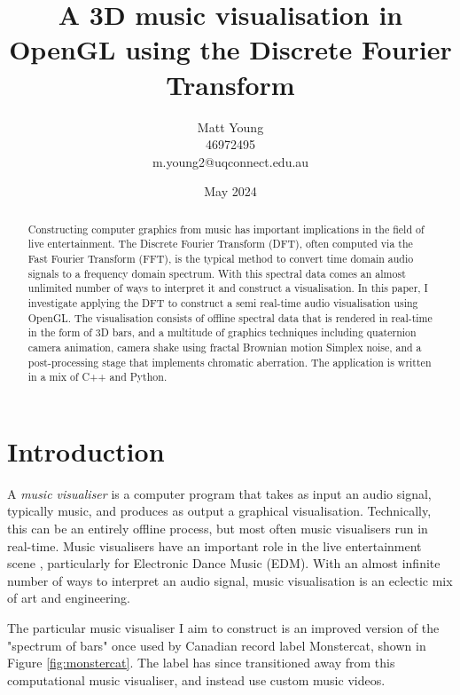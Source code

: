 \documentclass[11pt]{article}
\title{\textbf{A 3D music visualisation in OpenGL using the Discrete Fourier Transform}}
\author{Matt Young \\ 46972495 \\ m.young2@uqconnect.edu.au}
\date{May 2024}
\begin{document}
\maketitle

\begin{abstract}
    Constructing computer graphics from music has important implications in the field of live entertainment.
    The Discrete Fourier Transform (DFT), often computed via the Fast Fourier Transform (FFT), is the typical
    method to convert time domain audio signals to a frequency domain spectrum. With this spectral data comes
    an almost unlimited number of ways to interpret it and construct a visualisation. In this paper, I
    investigate applying the DFT to construct a semi real-time audio visualisation using OpenGL. The
    visualisation consists of offline spectral data that is rendered in real-time in the form of 3D bars, and
    a multitude of graphics techniques including quaternion camera animation, camera shake using fractal
    Brownian motion Simplex noise, and a post-processing stage that implements chromatic aberration. The
    application is written in a mix of C++ and Python.
\end{abstract}

\tableofcontents

\listoffigures
\clearpage

\section{Introduction}

A \textit{music visualiser} is a computer program that takes as input an audio signal, typically music, and
produces as output a graphical visualisation. Technically, this can be an entirely offline process, but most
often music visualisers run in real-time. Music visualisers have an important role in the live entertainment
scene \cite{mccarthy2022live}, particularly for Electronic Dance Music (EDM). With an almost infinite number
of ways to interpret an audio signal, music visualisation is an eclectic mix of art and engineering.

The particular music visualiser I aim to construct is an improved version of the "spectrum of bars" once used
by Canadian record label Monstercat, shown in Figure \ref{fig:monstercat}.
The label has since transitioned away
from this computational music visualiser, and instead use custom music videos.
\end{document}
